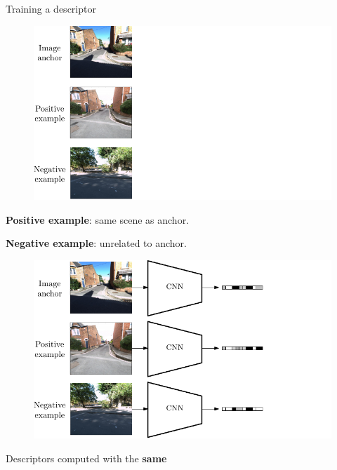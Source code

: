 \begin{frame}{Training a descriptor}
	\only<1>
	{
	\begin{figure}
	\centering
	\includegraphics[width=0.7\linewidth]{vect/method/fig2/1}
	\end{figure}
	\vfill
	\textbf{Positive example}: same scene as anchor.
	
	\textbf{Negative example}: unrelated to anchor.
	}
	{
	\begin{figure}
	\centering
	\includegraphics[width=0.7\linewidth]{vect/method/fig2/2}	
	\end{figure}	
	\vfill
	Descriptors computed with the \textbf{same}
	
}
\end{frame}
